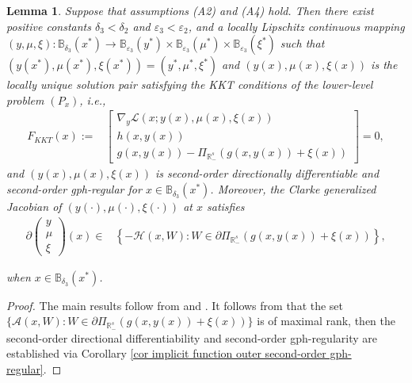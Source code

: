 \documentclass[11pt]{article}
\newtheorem{lemma}[theorem]{Lemma}
\theoremstyle{definition}
\theoremstyle{remark}
\numberwithin{equation}{section}
\begin{document}
\begin{lemma}\label{lemma Assump A y()}
 Suppose that assumptions   \textnormal{(A2)} and \textnormal{(A4)}  hold. Then there exist positive constants
$\delta_3<\delta_2$ and $\varepsilon_3<\varepsilon_2$, and a locally Lipschitz continuous mapping  $
(y,\mu,\xi):\mathbb{B}_{\delta_3}(x^*)\to\mathbb{B}_{\varepsilon_3}(y^*)\times\mathbb{B}_{\varepsilon_3}(\mu^*)
\times\mathbb{B}_{\varepsilon_3}(\xi^*) $ such that $(y(x^*),\mu(x^*),\xi(x^*))=(y^*,\mu^*,\xi^*)$ and $(y(x),\mu(x),\xi(x))$ is the locally unique solution pair
 satisfying the KKT conditions  of the lower-level problem $(P_x)$, i.e.,
 \begin{align}\label{Fkkt}
           F_{KKT}(x):= & \left[\begin{array}{c}
                                \nabla_y \mathcal{L}(x;y(x) ,\mu(x) ,\xi(x))\\
                                 h(x,y(x))\\
                                  g(x,y(x))-\Pi_{\mathbb{R}^s_{-}}(g(x,y(x))+\xi(x))
                              \end{array}\right]=0,
         \end{align}
          and $(y(x),\mu(x),\xi(x))$   is second-order directionally differentiable and second-order gph-regular
for $x\in \mathbb{B}_{\delta_3}(x^*)$. Moreover, the Clarke generalized Jacobian of $(y(\cdot),\mu(\cdot),\xi(\cdot))$ at $x$ satisfies
\begin{align}\label{partial y mu xi}
     \partial \left(\begin{array}{c}
                       y \\
                      \mu \\
                       \xi
                     \end{array}\right)(x)\in &\left\{-\mathcal{H}(x,W):W\in \partial \Pi_{\mathbb{R}^s_{-} }(g(x,y(x))+\xi(x))\right\},
\end{align}

when $x\in \mathbb{B}_{\delta_3}(x^*)$.
\end{lemma}
\begin{proof}
  The main results follow from  \cite[Theorems 2.1 and 4.1 and Corollary 2.2]{Robinson 80} and   \cite[Proposition 2.4]{Daiyh and Zhanglw}. It follows from \cite[Proposition 2.3]{Daiyh and Zhanglw} that   the set $\{\mathcal{A}(x,W):W\in \partial \Pi_{\mathbb{R}^s_{-} }(g(x,y(x))+\xi(x))\}$ is of maximal rank, then the second-order directional differentiability and second-order gph-regularity are established via  Corollary \ref{cor implicit function outer second-order gph-regular}.
\end{proof}
\end{document}
